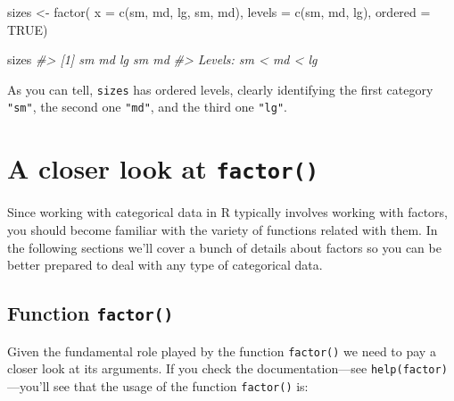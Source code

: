 \documentclass[
]{book}
\newenvironment{Shaded}{\begin{snugshade}}{\end{snugshade}}
\newcommand{\AttributeTok}[1]{\textcolor[rgb]{0.77,0.63,0.00}{#1}}
\newcommand{\CommentTok}[1]{\textcolor[rgb]{0.56,0.35,0.01}{\textit{#1}}}
\newcommand{\ConstantTok}[1]{\textcolor[rgb]{0.00,0.00,0.00}{#1}}
\newcommand{\FunctionTok}[1]{\textcolor[rgb]{0.00,0.00,0.00}{#1}}
\newcommand{\NormalTok}[1]{#1}
\newcommand{\OtherTok}[1]{\textcolor[rgb]{0.56,0.35,0.01}{#1}}
\newcommand{\StringTok}[1]{\textcolor[rgb]{0.31,0.60,0.02}{#1}}
\begin{document}
\begin{Shaded}
\begin{Highlighting}[]
\NormalTok{sizes }\OtherTok{\textless{}{-}} \FunctionTok{factor}\NormalTok{(}
  \AttributeTok{x =} \FunctionTok{c}\NormalTok{(}\StringTok{\textquotesingle{}sm\textquotesingle{}}\NormalTok{, }\StringTok{\textquotesingle{}md\textquotesingle{}}\NormalTok{, }\StringTok{\textquotesingle{}lg\textquotesingle{}}\NormalTok{, }\StringTok{\textquotesingle{}sm\textquotesingle{}}\NormalTok{, }\StringTok{\textquotesingle{}md\textquotesingle{}}\NormalTok{),}
  \AttributeTok{levels =} \FunctionTok{c}\NormalTok{(}\StringTok{\textquotesingle{}sm\textquotesingle{}}\NormalTok{, }\StringTok{\textquotesingle{}md\textquotesingle{}}\NormalTok{, }\StringTok{\textquotesingle{}lg\textquotesingle{}}\NormalTok{),}
  \AttributeTok{ordered =} \ConstantTok{TRUE}\NormalTok{)}

\NormalTok{sizes}
\CommentTok{\#\textgreater{} [1] sm md lg sm md}
\CommentTok{\#\textgreater{} Levels: sm \textless{} md \textless{} lg}
\end{Highlighting}
\end{Shaded}

As you can tell, \texttt{sizes} has ordered levels, clearly identifying the first
category \texttt{"sm"}, the second one \texttt{"md"}, and the third one \texttt{"lg"}.

\hypertarget{a-closer-look-at-factor}{%
\section{\texorpdfstring{A closer look at \texttt{factor()}}{A closer look at factor()}}\label{a-closer-look-at-factor}}

Since working with categorical data in R typically involves working with factors,
you should become familiar with the variety of functions related with them. In
the following sections we'll cover a bunch of details about factors so you can
be better prepared to deal with any type of categorical data.

\hypertarget{function-factor}{%
\subsection{\texorpdfstring{Function \texttt{factor()}}{Function factor()}}\label{function-factor}}

Given the fundamental role played by the function \texttt{factor()} we need to pay a
closer look at its arguments. If you check the documentation---see
\texttt{help(factor)}---you'll see that the usage of the function \texttt{factor()} is:
\end{document}

